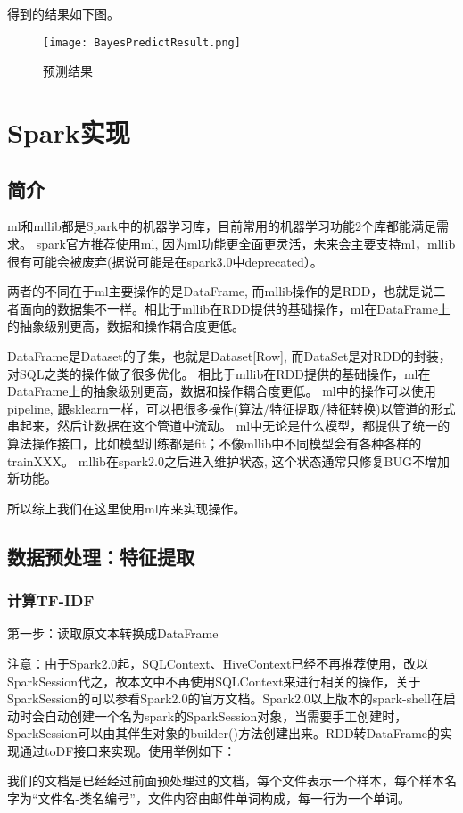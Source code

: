 \documentclass[lang=cn,11pt]{elegantpaper}
\begin{document}
得到的结果如下图。
\begin{figure}[htbp]
	\centering
	\texttt{[image: BayesPredictResult.png]}
	\caption{预测结果 \label{fig:BayesPredictResult}}
\end{figure}

\section{Spark实现}
\subsection{简介}
ml和mllib都是Spark中的机器学习库，目前常用的机器学习功能2个库都能满足需求。
spark官方推荐使用ml, 因为ml功能更全面更灵活，未来会主要支持ml，mllib很有可能会被废弃(据说可能是在spark3.0中deprecated）。

两者的不同在于ml主要操作的是DataFrame, 而mllib操作的是RDD，也就是说二者面向的数据集不一样。相比于mllib在RDD提供的基础操作，ml在DataFrame上的抽象级别更高，数据和操作耦合度更低。

DataFrame是Dataset的子集，也就是Dataset[Row], 而DataSet是对RDD的封装，对SQL之类的操作做了很多优化。
相比于mllib在RDD提供的基础操作，ml在DataFrame上的抽象级别更高，数据和操作耦合度更低。
ml中的操作可以使用pipeline, 跟sklearn一样，可以把很多操作(算法/特征提取/特征转换)以管道的形式串起来，然后让数据在这个管道中流动。
ml中无论是什么模型，都提供了统一的算法操作接口，比如模型训练都是fit；不像mllib中不同模型会有各种各样的trainXXX。
mllib在spark2.0之后进入维护状态, 这个状态通常只修复BUG不增加新功能。

所以综上我们在这里使用ml库来实现操作。
\subsection{数据预处理：特征提取}
\subsubsection{计算TF-IDF}
第一步：读取原文本转换成DataFrame

注意：由于Spark2.0起，SQLContext、HiveContext已经不再推荐使用，改以SparkSession代之，故本文中不再使用SQLContext来进行相关的操作，关于SparkSession的可以参看Spark2.0的官方文档。Spark2.0以上版本的spark-shell在启动时会自动创建一个名为spark的SparkSession对象，当需要手工创建时，SparkSession可以由其伴生对象的builder()方法创建出来。RDD转DataFrame的实现通过toDF接口来实现。使用举例如下：


我们的文档是已经经过前面预处理过的文档，每个文件表示一个样本，每个样本名字为“文件名-类名编号”，文件内容由邮件单词构成，每一行为一个单词。
\end{document}
